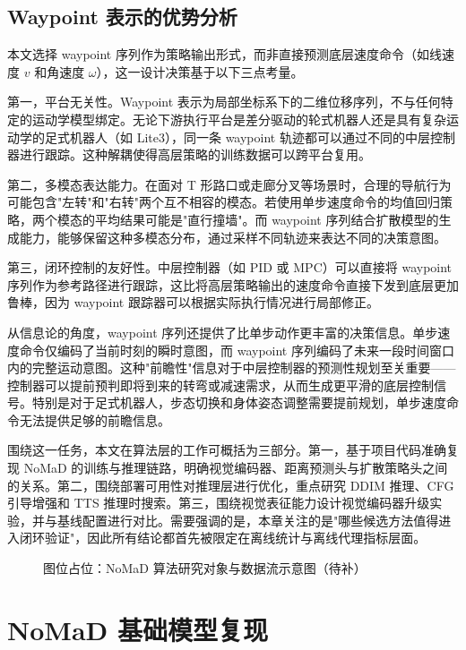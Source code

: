 \subsection{Waypoint 表示的优势分析}

本文选择 waypoint 序列作为策略输出形式，而非直接预测底层速度命令（如线速度 $v$ 和角速度 $\omega$），这一设计决策基于以下三点考量。

第一，平台无关性。Waypoint 表示为局部坐标系下的二维位移序列，不与任何特定的运动学模型绑定。无论下游执行平台是差分驱动的轮式机器人还是具有复杂运动学的足式机器人（如 Lite3），同一条 waypoint 轨迹都可以通过不同的中层控制器进行跟踪。这种解耦使得高层策略的训练数据可以跨平台复用。

第二，多模态表达能力。在面对 T 形路口或走廊分叉等场景时，合理的导航行为可能包含"左转"和"右转"两个互不相容的模态。若使用单步速度命令的均值回归策略，两个模态的平均结果可能是"直行撞墙"。而 waypoint 序列结合扩散模型的生成能力，能够保留这种多模态分布，通过采样不同轨迹来表达不同的决策意图。

第三，闭环控制的友好性。中层控制器（如 PID 或 MPC）可以直接将 waypoint 序列作为参考路径进行跟踪，这比将高层策略输出的速度命令直接下发到底层更加鲁棒，因为 waypoint 跟踪器可以根据实际执行情况进行局部修正。

从信息论的角度，waypoint 序列还提供了比单步动作更丰富的决策信息。单步速度命令仅编码了当前时刻的瞬时意图，而 waypoint 序列编码了未来一段时间窗口内的完整运动意图。这种"前瞻性"信息对于中层控制器的预测性规划至关重要——控制器可以提前预判即将到来的转弯或减速需求，从而生成更平滑的底层控制信号。特别是对于足式机器人，步态切换和身体姿态调整需要提前规划，单步速度命令无法提供足够的前瞻信息。

围绕这一任务，本文在算法层的工作可概括为三部分。第一，基于项目代码准确复现 NoMaD 的训练与推理链路，明确视觉编码器、距离预测头与扩散策略头之间的关系。第二，围绕部署可用性对推理层进行优化，重点研究 DDIM 推理、CFG 引导增强和 TTS 推理时搜索。第三，围绕视觉表征能力设计视觉编码器升级实验，并与基线配置进行对比。需要强调的是，本章关注的是"哪些候选方法值得进入闭环验证"，因此所有结论都首先被限定在离线统计与离线代理指标层面。

\begin{figure}[htbp]
    \centering
    \fbox{\rule{0pt}{55mm}\rule{0.84\linewidth}{0pt}}
    \caption{图位占位：NoMaD 算法研究对象与数据流示意图（待补）}
    \label{fig:algo-overview-placeholder}
\end{figure}

\section{NoMaD 基础模型复现}

